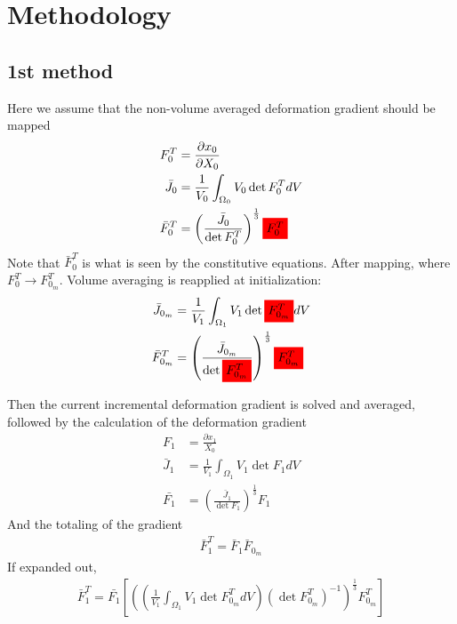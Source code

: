 \section{Methodology}

\subsection{1st method}
Here we assume that the non-volume averaged deformation gradient should be mapped
    \begin{align}
        F^T_0 &= \frac{\partial x_0}{\partial X_0}\\
        \bar{J_0} &= \frac{1}{V_0}\int_{\Omega_0}V_0\det{F^T_0}d V\\
        \bar{F}^T_0 &= \left(\frac{\bar{J}_0}{\det{F^T_0}}\right)^{\frac{1}{3}}\hl{F^T_0}
    \end{align}
Note that $\bar{F}^T_0$ is what is seen by the constitutive equations.
After mapping, where $F^T_0 \rightarrow F^T_{0_m}$. Volume averaging is reapplied at initialization:
\begin{align}
    \bar{J}_{0_m} &= \frac{1}{V_1}\int_{\Omega_1}V_1\det \hl{F^T_{0_m}} dV\\
    \bar{F}^T_{0_m} &= \left(\frac{\bar{J}_{0_m}}{\det{\hl{F^T_{0_m}}}}\right)^\frac{1}{3}\hl{F^T_{0_m}}
\end{align}

Then the current incremental deformation gradient is solved and averaged, followed by the calculation of the deformation gradient
\begin{align}
    F_1 &= \frac{\partial x_1}{X_0}\\
 \bar{J}_{1} &= \frac{1}{V_1}\int_{\Omega_1}V_1\det F_1 dV\\
    \bar{F_1} &= \left(\frac{\bar{J}_{1}}{\det{F_1}}\right)^\frac{1}{3}F_1
\end{align}
And the totaling of the gradient
\begin{align}
    \bar{F}_1^T = \bar{F}_1\bar{F}_{0_m}
\end{align}
If expanded out,
\begin{align}
    \bar{F}_1^T = \bar{F_1}\left[\left(\left(\frac{1}{V_1}\int_{\Omega_1}V_1\det{F^T_{0_m}}dV\right)\left(\det{F^T_{0_m}}\right)^{-1}\right)^{\frac{1}{3}}F^T_{0_m}\right]
\end{align}

